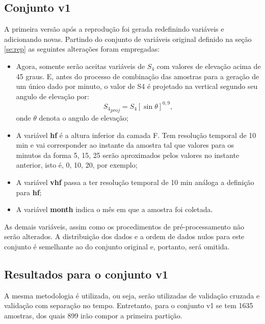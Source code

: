 
\subsection{Conjunto v1}\label{sec:v1}

A primeira versão após a reprodução foi gerada redefinindo variáveis e adicionando novas. Partindo do conjunto de variáveis original definido na seção \ref{se:rep} as seguintes alterações foram empregadas:

\begin{itemize}
\item Agora, somente serão aceitas variáveis de $S_4$ com valores de elevação acima de 45 graus. E, antes do processo de combinação das amostras para a geração de um único dado por minuto, o valor de S4 é projetado na vertical segundo seu angulo de elevação por:
\begin{equation}
{S_4}_{proj}=S_4[\sin\theta]^{0,9}\mbox{,}~
\end{equation}
onde $\theta$ denota o angulo de elevação;
\item A variável {\bf hf} é a altura inferior da camada F. Tem resolução temporal de 10 min e vai corresponder ao instante da amostra tal que valores para os minutos da forma 5, 15, 25 serão aproximados pelos valores no instante anterior, isto é, 0, 10, 20, por exemplo;
\item A variável {\bf vhf} passa a ter resolução temporal de 10 min análoga a definição para {\bf hf};
\item A variável {\bf month} indica o mês em que a amostra foi coletada.
\end{itemize}

As demais variáveis, assim como os procedimentos de pré-processamento não serão alterados. A distribuição dos dados e a ordem de dados nulos para este conjunto é semelhante ao do conjunto original e, portanto, será omitida.

\subsection{Resultados para o conjunto v1}

A mesma metodologia é utilizada, ou seja, serão utilizadas de validação cruzada e validação com separação no tempo. Entretanto, para o conjunto v1 se tem 1635 amostras, dos quais 899 irão compor a primeira partição.

